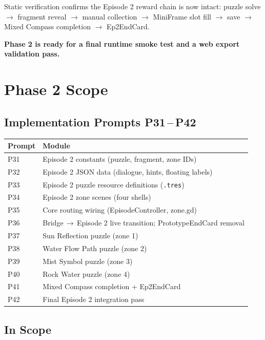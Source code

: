\documentclass[12pt, a4paper]{article}
\begin{document}
Static verification confirms the Episode 2 reward chain is now intact:
puzzle solve $\to$ fragment reveal $\to$ manual collection $\to$ MiniFrame
slot fill $\to$ save $\to$ Mixed Compass completion $\to$ Ep2EndCard.

\textbf{Phase 2 is ready for a final runtime smoke test and a web export
validation pass.}

\section{Phase 2 Scope}

\subsection{Implementation Prompts P31\,--\,P42}

\begin{center}
\begin{tabular}{ll}
\toprule
\textbf{Prompt} & \textbf{Module} \\
\midrule
P31 & Episode 2 constants (puzzle, fragment, zone IDs) \\
P32 & Episode 2 JSON data (dialogue, hints, floating labels) \\
P33 & Episode 2 puzzle resource definitions (\texttt{.tres}) \\
P34 & Episode 2 zone scenes (four shells) \\
P35 & Core routing wiring (EpisodeController, zone.gd) \\
P36 & Bridge\,$\to$\,Episode 2 live transition; PrototypeEndCard removal \\
P37 & Sun Reflection puzzle (zone 1) \\
P38 & Water Flow Path puzzle (zone 2) \\
P39 & Mist Symbol puzzle (zone 3) \\
P40 & Rock Water puzzle (zone 4) \\
P41 & Mixed Compass completion + Ep2EndCard \\
P42 & Final Episode 2 integration pass \\
\bottomrule
\end{tabular}
\end{center}

\subsection{In Scope}
\end{document}
